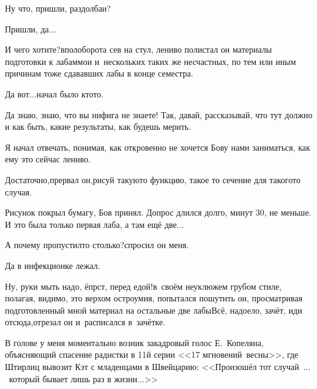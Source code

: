 \diagdash Ну что, пришли, раздолбаи? 

\diagdash Пришли, да$\ldots$

\diagdash И чего хотите?\mdash вполоборота сев на стул, лениво полистал он материалы подготовки к лабам\mdash мои и~нескольких таких же несчастных, по тем или иным причинам тоже сдававших лабы в конце семестра.

\diagdash Да вот$\ldots$\mdash начал было кто\sdash то.

\diagdash Да знаю, знаю, что вы нифига не знаете! Так, давай, рассказывай, что тут должно и как быть, какие результаты, как будешь мерить.

Я начал отвечать, понимая, как откровенно не хочется Б\sdash ову нами заниматься, как ему это сейчас лениво.

\diagdash Достаточно,\mdash прервал он,\mdash рисуй такую\sdash то функцию, такое то сечение для такого\sdash то случая.

Рисунок покрыл бумагу, Б\sdash ов принял. Допрос длился долго, минут 30, не меньше. И это была только первая лаба, а там ещё две$\ldots$

\diagdash А почему пропустил\sdash то столько?\mdash спросил он меня.

\diagdash Да в инфекционке лежал.

\diagdash Ну, руки мыть надо, ёпрст, перед едой!\mdash в~своём неуклюжем грубом стиле, полагая, видимо, это верхом остроумия, попытался пошутить он, просматривая подготовленный мной материал на остальные две лабы\mdash Всё, надоело, зачёт, иди отсюда,\mdash отрезал он и~расписался в~зачётке.

В голове у меня моментально возник закадровый голос Е.~Копеляна, объясняющий спасение радистки в 11\sdash й серии <<17 мгновений~весны>>, где Штирлиц вывозит Кэт с младенцами в Швейцарию: <<Произошёл тот случай~$\ldots$~который бывает лишь раз в жизни$\ldots$>>



\begin{center}
\end{center}